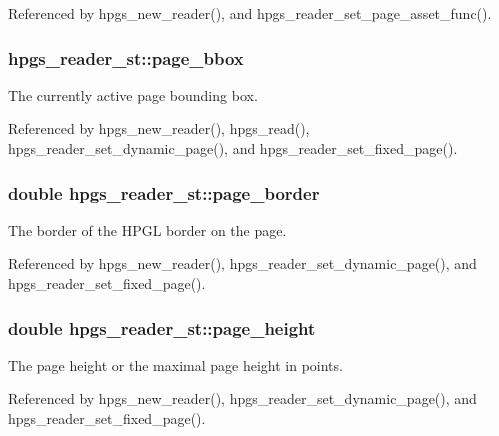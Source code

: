 Referenced by hpgs\_\-new\_\-reader(), and hpgs\_\-reader\_\-set\_\-page\_\-asset\_\-func().

\subsubsection[{page\_\-bbox}]{ {\bf hpgs\_\-reader\_\-st::page\_\-bbox}}\label{structhpgs__reader__st_a36a681f5552fb748728a6e181b5935fe}
The currently active page bounding box. 

Referenced by hpgs\_\-new\_\-reader(), hpgs\_\-read(), hpgs\_\-reader\_\-set\_\-dynamic\_\-page(), and hpgs\_\-reader\_\-set\_\-fixed\_\-page().

\subsubsection[{page\_\-border}]{\setlength{\rightskip}{0pt plus 5cm}double {\bf hpgs\_\-reader\_\-st::page\_\-border}}\label{structhpgs__reader__st_a1c27af742da3c6b23a667d5adf8ccbc8}
The border of the HPGL border on the page. 

Referenced by hpgs\_\-new\_\-reader(), hpgs\_\-reader\_\-set\_\-dynamic\_\-page(), and hpgs\_\-reader\_\-set\_\-fixed\_\-page().

\subsubsection[{page\_\-height}]{\setlength{\rightskip}{0pt plus 5cm}double {\bf hpgs\_\-reader\_\-st::page\_\-height}}\label{structhpgs__reader__st_afb8ffce6da9c89b402445c858d0d8104}
The page height or the maximal page height in points. 

Referenced by hpgs\_\-new\_\-reader(), hpgs\_\-reader\_\-set\_\-dynamic\_\-page(), and hpgs\_\-reader\_\-set\_\-fixed\_\-page().

